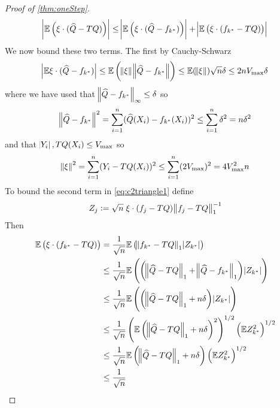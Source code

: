 \begin{proof}[Proof of \cref{thm:oneStep}]
  \begin{equation}
    \abs{\mathbb{E} \left( \xi \cdot (\widehat{Q} - TQ) \right) }
    \leq \abs{\mathbb{E} \left( \xi \cdot (\widehat{Q} - f_{k^*}) \right) } 
    + \abs{\mathbb{E} \left( \xi \cdot (f_{k^*} - TQ) \right) }
    \label{eq:c2triangle1}
  \end{equation}
  We now bound these two terms. The first by Cauchy-Schwarz
  \begin{equation}
    \abs{\mathbb{E} \xi \cdot (\widehat{Q} - f_{k^*})}
    \leq \mathbb{E} \left( \norm{\xi} \norm{\widehat{Q} - f_{k^*}} \right)
    \leq \mathbb{E} (\norm{\xi}) \sqrt{n} \delta
    \leq 2 n V_{\max} \delta
    \label{eq:c2firstcs}
  \end{equation}
  where we have used that $\norm{\widehat{Q} - f_{k^*}}_\infty \leq \delta$ so
  \begin{equation}
    \norm{\widehat{Q} - f_{k^*}}^2
    = \sum_{i=1}^n (\widehat{Q}(X_i) - f_{k^*}(X_i))^2
    \leq \sum_{i=1}^n \delta^2
    = n \delta^2
  \end{equation}
  and that $\abs{Y_i}, TQ(X_i) \leq V_{\max}$ so
  \begin{equation}
    \norm{\xi}^2 = \sum_{i=1}^n (Y_i - TQ(X_i))^2 
    \leq \sum_{i=1}^n (2 V_{\max})^2
    = 4 V_{\max}^2 n
  \end{equation}
  To bound the second term in \cref{eq:c2triangle1} define
  \begin{equation}
  Z_j := \sqrt{n} \; \xi \cdot (f_j - TQ) \norm{f_j - TQ}_1^{-1}
  \end{equation}
  Then
  \begin{align}
    \E \left( \xi \cdot (f_{k^*} - TQ) \right)
    &= \frac{1}{\sqrt{n}} \E \left( \norm{f_{k^*} - TQ}_1 \abs{Z_{k^*}} \right)
    \label{eq:long1_1}
    \\ &\leq \frac{1}{\sqrt{n}}
    \E \left( \left(\norm{\wh{Q} -TQ}_1 + \norm{\wh{Q} - f_{k^*}}_1 \right)
    \abs{Z_{k^*}} \right) 
    \label{eq:long1_2}
    \\ &\leq \frac{1}{\sqrt{n}}
    \E \left( \left(\norm{\wh{Q} -TQ}_1 + n \delta \right)
    \abs{Z_{k^*}} \right) 
    \label{eq:long1_3}
    \\ &\leq \frac{1}{\sqrt{n}}
    \left( \E \left(\norm{\wh{Q} -TQ}_1 + n \delta \right)^2 \right)^{1/2}
    \left( \E Z_{k^*}^2 \right)^{1/2} 
    \label{eq:long1_4}
    \\ &\leq \frac{1}{\sqrt{n}}
    \E \left(\norm{\wh{Q} -TQ}_1 + n \delta \right) 
    \left( \E Z_{k^*}^2 \right)^{1/2} 
    \label{eq:long1_5}
    \\ &\leq \frac{1}{\sqrt{n}}

\end{align}
\end{proof}
